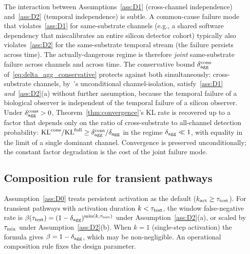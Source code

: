\begin{remark}
\label{rem:cross_substrate_rate}
The interaction between Assumptions~\ref{ass:D1}
(cross-channel independence) and~\ref{ass:D2} (temporal
independence) is subtle.  A common-cause failure mode that
violates~\ref{ass:D1} for same-substrate channels (e.g., a shared
software dependency that miscalibrates an entire silicon
detector cohort) typically also violates~\ref{ass:D2} for the
same-substrate temporal stream (the failure persists across
time).  The actually-dangerous regime is therefore
\emph{joint} same-substrate failure across channels and across
time.  The conservative bound $\delta_{\mathrm{agg}}^{\mathrm{cons}}$
of~\eqref{eq:delta_agg_conservative} protects against both
simultaneously: cross-substrate channels, by~\citep[Proposition~5]{lasser2026exo}'s
unconditional channel-isolation, satisfy~\ref{ass:D1}
\emph{and}~\ref{ass:D2}(a) without further assumption, because
the temporal failure of a biological observer is independent of
the temporal failure of a silicon observer.  Under
$\delta_{\mathrm{agg}}^{\mathrm{cons}} > 0$, Theorem~\ref{thm:convergence}'s
KL rate is recovered up to a factor that depends only on the
ratio of cross-substrate to all-channel detection probability:
$\mathrm{KL}^{\mathrm{cons}} / \mathrm{KL}^{\mathrm{full}} \geq
\delta_{\mathrm{agg}}^{\mathrm{cons}} / \delta_{\mathrm{agg}}$ in the regime
$\delta_{\mathrm{agg}} \ll 1$, with equality in the limit of a single
dominant channel.  Convergence is preserved unconditionally; the
constant factor degradation is the cost of the joint failure
mode.
\end{remark}

\subsection{Composition rule for transient pathways}
\label{sec:transient_composition}

Assumption~\ref{ass:D0} treats persistent activation as the
default ($k_{\mathrm{act}} \geq \tau_{\mathrm{test}}$).  For transient
pathways with activation duration $k < \tau_{\mathrm{test}}$, the
window false-negative rate is
$\beta(\tau_{\mathrm{test}}) = (1 - \delta_{\mathrm{agg}})^{\min(k, \tau_{\mathrm{test}})}$ under
Assumption~\ref{ass:D2}(a), or scaled by $\tau_{\mathrm{mix}}$ under
Assumption~\ref{ass:D2}(b).  When $k = 1$ (single-step
activation) the formula gives $\beta = 1 - \delta_{\mathrm{agg}}$, which
may be non-negligible.  An operational composition rule fixes
the design parameter.


